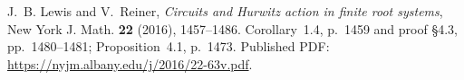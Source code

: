  J.~B. Lewis and V.~Reiner,
\emph{Circuits and Hurwitz action in finite root systems},
New York J. Math. \textbf{22} (2016), 1457--1486.
Corollary~1.4, p.~1459 and proof \S4.3, pp.~1480--1481;
Proposition~4.1, p.~1473.
Published PDF: \url{https://nyjm.albany.edu/j/2016/22-63v.pdf}.
